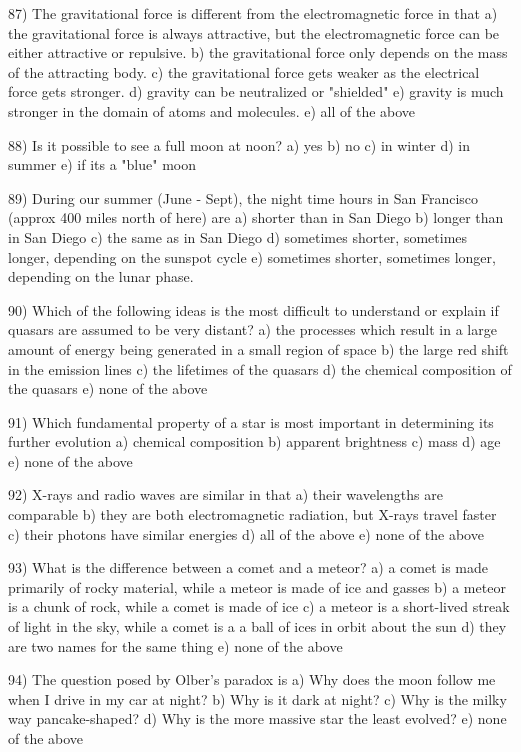 87) The gravitational force is different from the electromagnetic force in that
a) the gravitational force is always attractive, but the electromagnetic
force can be either attractive or repulsive.
b) the gravitational force only depends on the mass of the attracting body.
c) the gravitational force gets weaker as the electrical force gets stronger.
d) gravity can be neutralized or "shielded"
e) gravity is much stronger in the domain of atoms and molecules.
e) all of the above

88) Is it possible to see a full moon at noon?
a) yes b) no c) in winter d) in summer e) if its a "blue" moon

89) During our summer (June - Sept), the night time hours in San Francisco
(approx 400 miles north of here) are
a) shorter than in San Diego
b) longer than in San Diego
c) the same as in San Diego
d) sometimes shorter, sometimes longer, depending on the sunspot cycle
e) sometimes shorter, sometimes longer, depending on the lunar phase.

90) Which of the following ideas is the most difficult to understand or explain
if quasars are assumed to be very distant?
a) the processes which result in a large amount of energy being generated
in a small region of space
b) the large red shift in the emission lines
c) the lifetimes of the quasars
d) the chemical composition of the quasars
e) none of the above

91) Which fundamental property of a star is most important in determining
its further evolution
a) chemical composition b) apparent brightness
c) mass d) age e) none of the above

92) X-rays and radio waves are similar in that
a) their wavelengths are comparable
b) they are both electromagnetic radiation, but X-rays travel faster
c) their photons have similar energies
d) all of the above
e) none of the above

93) What is the difference between a comet and a meteor?
a) a comet is made primarily of rocky material, while a meteor
is made of ice and gasses
b) a meteor is a chunk of rock, while a comet is made of ice
c) a meteor is a short-lived streak of light in the sky, while
a comet is a a ball of ices in orbit about the sun
d) they are two names for the same thing
e) none of the above

94) The question posed by Olber's paradox is
a) Why does the moon follow me when I drive in my car at night?
b) Why is it dark at night?
c) Why is the milky way pancake-shaped?
d) Why is the more massive star the least evolved?
e) none of the above

